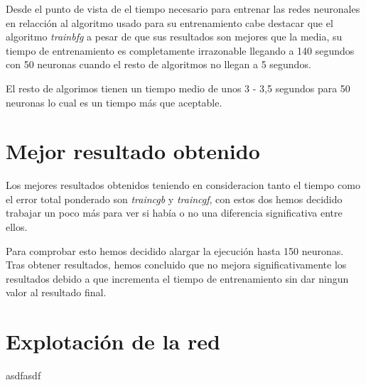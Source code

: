 \documentclass[a4paper,12pt,titlepage]{article}
\begin{document}
Desde el punto de vista de el tiempo necesario para entrenar las redes neuronales en relacción al algoritmo usado para su entrenamiento cabe destacar que el algoritmo \textit{trainbfg} a pesar de que sus resultados son mejores que la media, su tiempo de entrenamiento es completamente irrazonable llegando a 140 segundos con 50 neuronas cuando el resto de algoritmos no llegan a 5 segundos.

El resto de algorimos tienen un tiempo medio de unos 3 - 3,5 segundos para 50 neuronas lo cual es un tiempo más que aceptable.

\section{Mejor resultado obtenido}

Los mejores resultados obtenidos teniendo en consideracion tanto el tiempo como el error total ponderado son \textit{traincgb} y \textit{traincgf}, con estos dos hemos decidido trabajar un poco más para ver si había o no una diferencia significativa entre ellos. 

Para comprobar esto hemos decidido alargar la ejecución hasta 150 neuronas. Tras obtener resultados, hemos concluido que no mejora significativamente los resultados debido a que incrementa el tiempo de entrenamiento sin dar ningun valor al resultado final.



\section{Explotación de la red}

asdfasdf

\newpage


\end{document}
